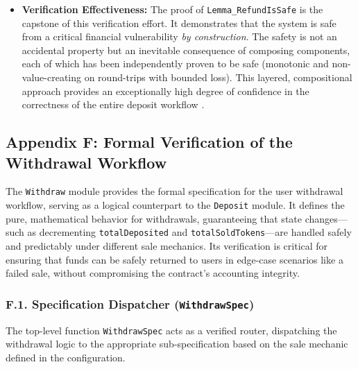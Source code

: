 \documentclass[
  english,
  onecolumn]{article}
\begin{document}
\begin{itemize}
\item
  \textbf{Verification Effectiveness:} The proof of
  \texttt{Lemma\_RefundIsSafe} is the capstone of this verification
  effort. It demonstrates that the system is safe from a critical
  financial vulnerability \emph{by construction}. The safety is not an
  accidental property but an inevitable consequence of composing
  components, each of which has been independently proven to be safe
  (monotonic and non-value-creating on round-trips with bounded loss).
  This layered, compositional approach provides an exceptionally high
  degree of confidence in the correctness of the entire deposit workflow
  .
\end{itemize}

\subsection{Appendix F: Formal Verification of the Withdrawal
Workflow}\label{appendix-f-formal-verification-of-the-withdrawal-workflow}

The \texttt{Withdraw} module provides the formal specification for the
user withdrawal workflow, serving as a logical counterpart to the
\texttt{Deposit} module. It defines the pure, mathematical behavior for
withdrawals, guaranteeing that state changes---such as decrementing
\texttt{totalDeposited} and \texttt{totalSoldTokens}---are handled
safely and predictably under different sale mechanics. Its verification
is critical for ensuring that funds can be safely returned to users in
edge-case scenarios like a failed sale, without compromising the
contract's accounting integrity.

\subsubsection{\texorpdfstring{F.1. Specification Dispatcher
(\texttt{WithdrawSpec})}{F.1. Specification Dispatcher (WithdrawSpec)}}\label{f.1.-specification-dispatcher-withdrawspec}

The top-level function \texttt{WithdrawSpec} acts as a verified router,
dispatching the withdrawal logic to the appropriate sub-specification
based on the sale mechanic defined in the configuration.
\end{document}

